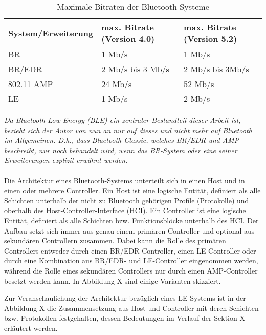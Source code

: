 \begin{table}
    \begin{tabular}[h]{|l|l|l|}
    \hline
    \textbf{System/Erweiterung} & \textbf{max. Bitrate (Version 4.0)} & \textbf{max. Bitrate (Version 5.2)} \\
    \hline
    BR & 1 Mb/s & 1 Mb/s \\
    \hline
    BR/EDR & 2 Mb/s bis 3 Mb/s & 2 Mb/s bis 3Mb/s \\
    \hline
    802.11 AMP & 24 Mb/s & 52 Mb/s \\
    \hline
    LE & 1 Mb/s & 2 Mb/s \\
    \hline
    \end{tabular}
    \caption{Maximale Bitraten der Bluetooth-Systeme}
\end{table}

\textit{Da Bluetooth Low Energy (BLE) ein zentraler Bestandteil dieser Arbeit ist, bezieht sich der Autor von nun an nur auf dieses und nicht mehr auf Bluetooth im Allgemeinen. D.h., dass Bluetooth Classic, welches BR/EDR und AMP beschreibt, nur noch behandelt wird, wenn das BR-System oder eine seiner Erweiterungen explizit erwähnt werden.}
\\\\
Die Architektur eines Bluetooth-Systems unterteilt sich in einen Host und in einen oder mehrere Controller. Ein Host ist eine logische Entität, definiert als alle Schichten unterhalb der nicht zu Bluetooth gehörigen Profile (Protokolle) und oberhalb des Host-Controller-Interface (HCI). Ein Controller ist eine logische Entität, definiert als alle Schichten bzw. Funktionsblöcke unterhalb des HCI. Der Aufbau setzt sich immer aus genau einem primären Controller und optional aus sekundären Controllern zusammen. Dabei kann die Rolle des primären Controllers entweder durch einen BR/EDR-Controller, einen LE-Controller oder durch eine Kombination aus BR/EDR- und LE-Controller eingenommen werden, während die Rolle eines sekundären Controllers nur durch einen AMP-Controller besetzt werden kann. In Abbildung X
 sind einige Varianten skizziert. 


Zur Veranschaulichung der Architektur bezüglich eines LE-Systems ist in der Abbildung X
die Zusammensetzung aus Host und Controller mit deren Schichten bzw. Protokollen festgehalten, dessen Bedeutungen im Verlauf der Sektion X
erläutert werden.


